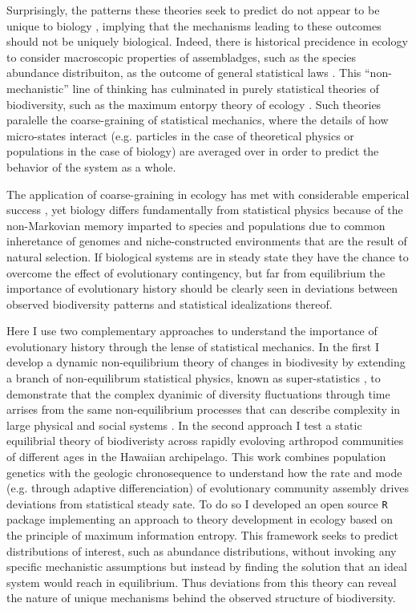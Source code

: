 Surprisingly, the patterns these theories seek to predict do not
appear to be unique to biology \citep{nekola2007}, implying that the
mechanisms leading to these outcomes should not be uniquely
biological.  Indeed, there is historical precidence in ecology to
consider macroscopic properties of assembladges, such as the species
abundance distribuiton, as the outcome of general statistical laws
\citep{fisher1943, preston1950, preston1962a, preston1962b}. This
``non-mechanistic'' line of thinking has culminated in purely
statistical theories of biodiversity, such as the maximum entorpy
theory of ecology \citep{harte2011}. Such theories paralelle the
coarse-graining of statistical mechanics, where the details of how
micro-states interact (e.g. particles in the case of theoretical
physics or populations in the case of biology) are averaged over in
order to predict the behavior of the system as a whole.

The application of coarse-graining in ecology has met with
considerable emperical success \citep[e.g.][]{banavar2007, pueyo2007,
  dewar2008, harte2011}, yet biology differs fundamentally from
statistical physics because of the non-Markovian memory imparted to
species and populations due to common inheretance of genomes and
niche-constructed environments \citep{odling2003} that are the result
of natural selection.  If biological systems are in steady state they
have the chance to overcome the effect of evolutionary contingency,
but far from equilibrium the importance of evolutionary history should
be clearly seen in deviations between observed biodiversity patterns
and statistical idealizations thereof.

Here I use two complementary approaches to understand the importance
of evolutionary history through the lense of statistical mechanics.
In the first I develop a dynamic non-equilibrium theory of changes in
biodivesity by extending a branch of non-equilibrum statistical
physics, known as super-statistics \citep{beck2003, beck2004}, to
demonstrate that the complex dyanimic of diversity fluctuations
through time arrises from the same non-equilibrium processes that can
describe complexity in large physical \citep{beck2004} and social
systems \citep{fuentes2009}.  In the second approach I test a static
equilibrial theory of biodiveristy \citep[the maximum entropy theory
of ecology][]{harte2011} across rapidly evoloving arthropod
communities of different ages in the Hawaiian archipelago. This work
combines population genetics with the geologic chronosequence to
understand how the rate and mode (e.g. through adaptive
differenciation) of evolutionary community assembly drives deviations
from statistical steady sate. To do so I developed an open source
\texttt{R} package implementing an approach to theory development in
ecology based on the principle of maximum information entropy. This
framework seeks to predict distributions of interest, such as
abundance distributions, without invoking any specific mechanistic
assumptions but instead by finding the solution that an ideal system
would reach in equilibrium.  Thus deviations from this theory can
reveal the nature of unique mechanisms behind the observed structure
of biodiversity.


\printbibliography[heading=subbibliography]


